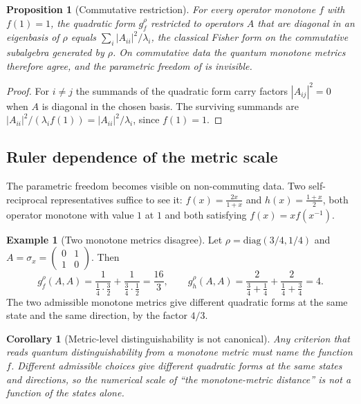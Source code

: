\documentclass[11pt,letterpaper]{article}
\newtheorem{proposition}[theorem]{Proposition}
\newtheorem{corollary}[theorem]{Corollary}
\theoremstyle{definition}
\newtheorem{example}[theorem]{Example}
\theoremstyle{remark}
\begin{document}
\begin{proposition}[Commutative restriction]
\label{prop:commutative}
For every operator monotone $f$ with $f(1) = 1$, the quadratic form $g_f^{\rho}$ restricted to operators $A$ that are diagonal in an eigenbasis of $\rho$ equals $\sum_i |A_{ii}|^2 / \lambda_i$, the classical Fisher form on the commutative subalgebra generated by $\rho$. On commutative data the quantum monotone metrics therefore agree, and the parametric freedom of  is invisible.
\end{proposition}

\begin{proof}
For $i \neq j$ the summands of the quadratic form carry factors $|A_{ij}|^2 = 0$ when $A$ is diagonal in the chosen basis. The surviving summands are $|A_{ii}|^2 / (\lambda_i f(1)) = |A_{ii}|^2 / \lambda_i$, since $f(1) = 1$.
\end{proof}

\subsection{Ruler dependence of the metric scale}

The parametric freedom becomes visible on non-commuting data. Two self-reciprocal representatives suffice to see it: $f(x) = \tfrac{2x}{1+x}$ and $h(x) = \tfrac{1+x}{2}$, both operator monotone with value $1$ at $1$ and both satisfying $f(x) = x f(x^{-1})$.

\begin{example}[Two monotone metrics disagree]
\label{ex:monotone}
Let $\rho = \mathrm{diag}(3/4, 1/4)$ and $A = \sigma_x = \left(\begin{smallmatrix} 0 & 1 \\ 1 & 0 \end{smallmatrix}\right)$. Then
\[
g_f^{\rho}(A, A) = \frac{1}{\tfrac{1}{4} \cdot \tfrac{3}{2}} + \frac{1}{\tfrac{3}{4} \cdot \tfrac{1}{2}} = \frac{16}{3},
\qquad
g_h^{\rho}(A, A) = \frac{2}{\tfrac{3}{4} + \tfrac{1}{4}} + \frac{2}{\tfrac{1}{4} + \tfrac{3}{4}} = 4.
\]
The two admissible monotone metrics give different quadratic forms at the same state and the same direction, by the factor $4/3$.
\end{example}

\begin{corollary}[Metric-level distinguishability is not canonical]
\label{cor:noncanonical}
Any criterion that reads quantum distinguishability from a monotone metric must name the function $f$. Different admissible choices give different quadratic forms at the same states and directions, so the numerical scale of ``the monotone-metric distance'' is not a function of the states alone.
\end{corollary}
\end{document}
